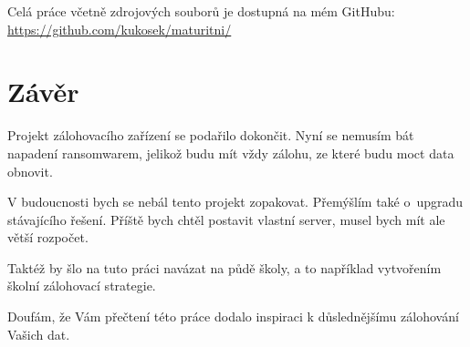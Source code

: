 \documentclass[a4paper,12pt, oneside]{book}
\begin{document}
Celá práce včetně zdrojových souborů je dostupná na mém GitHubu:
\url{https://github.com/kukosek/maturitni/}




\chapter{Závěr}


Projekt zálohovacího zařízení se podařilo dokončit. 
Nyní se nemusím bát napadení
ransomwarem, jelikož budu mít vždy zálohu, ze které budu moct data obnovit.

V budoucnosti bych se nebál tento projekt zopakovat. Přemýšlím také 
o upgradu stávajícího řešení. Příště bych chtěl postavit vlastní server,
musel bych mít ale větší rozpočet. 

Taktéž by šlo na tuto práci navázat 
na půdě školy, a to například vytvořením školní zálohovací strategie.

 Doufám, že Vám přečtení této práce dodalo inspiraci k
důslednějšímu zálohování Vašich dat.



\nocite{*}
\printbibliography[
	heading=bibintoc,
	title={Seznam zdrojů}
]

\cleardoublepage
\listoffigures
{}
\end{document}

